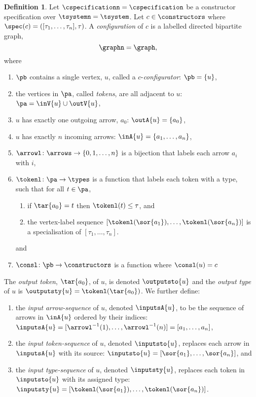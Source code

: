 \documentclass[a4paper]{article}
\theoremstyle{definition}
\newtheorem{definition}{Definition}
\begin{document}
	\begin{definition}\label{defn:configuration}
		Let $\cspecificationn=\cspecification$ be a constructor specification over $\tsystemn=\tsystem$. Let $c\in \constructors$ where
		$\spec(c) =([\tau_1,\ldots,\tau_n], \tau)$.  A \textit{configuration} of $c$ is a labelled directed bipartite graph, $$\graphn=\graph,$$ where
		\begin{enumerate}[itemsep=0pt,topsep=4pt]
			\item $\pb$ contains a single vertex, $u$, called a $c$-\textit{configurator}: $\pb=\{u\}$,
			\item the vertices in $\pa$, called \textit{tokens}, are all adjacent to $u$: $\pa=\inV{u}\cup \outV{u}$,
			\item $u$ has exactly one outgoing arrow, $a_{0}$: $\outA{u}=\{a_{0}\}$,
			\item $u$ has exactly $n$ incoming arrows: $\inA{u}=\{a_1,\ldots,a_n\}$,
			\item $\arrowl\colon \arrows\to \{0,1,\ldots,n\}$ is a bijection that labels each arrow $a_{i}$ with $i$,
			\item $\tokenl\colon \pa \to \types$ is a function that labels each token with a type, such that for all $t\in \pa$,
			\begin{enumerate}[itemsep=0pt,topsep=2pt]
				\item if $\tar{a_{0}}=t$  then $\tokenl(t)\leq \tau$, and
				\item the vertex-label sequence $[\tokenl(\sor{a_1}),\ldots,\tokenl(\sor{a_n})]$ is a specialisation of $[\tau_1,\ldots,\tau_n]$.
			\end{enumerate}
			and
			\item $\consl\colon \pb \to \constructors$ is a function where $\consl(u)=c$
			
		\end{enumerate}
		The \textit{output token}, $\tar{a_0}$, of $u$, is denoted $\outputsto{u}$ and the \textit{output type} of $u$ is $\outputsty{u}=\tokenl(\tar{a_0})$. We further define:
		\begin{enumerate}[itemsep=0pt,topsep=4pt]
			\item the \textit{input arrow-sequence} of $u$, denoted $\inputsA{u}$, to be the sequence of arrows in $\inA{u}$ ordered by their indices: $\inputsA{u} = [\arrowl^{-1}(1),\ldots,\arrowl^{-1}(n)] = [a_1,\ldots,a_n]$,
			\item the \textit{input token-sequence} of $u$, denoted $\inputsto{u}$, replaces each arrow in $\inputsA{u}$ with its source: $\inputsto{u} = [\sor{a_1},\ldots,\sor{a_n}]$, and
			\item the \textit{input type-sequence} of $u$, denoted $\inputsty{u}$, replaces each token in $\inputsto{u}$ with its assigned type: $\inputsty{u} = [\tokenl(\sor{a_1}),\ldots,\tokenl(\sor{a_n})]$.
		\end{enumerate}
	\end{definition}
\end{document}
